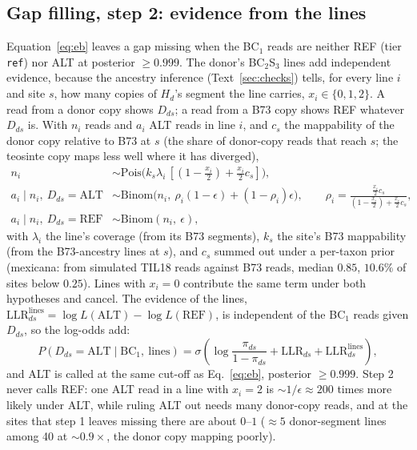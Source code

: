 \documentclass[11pt]{article}
\newcommand{\REF}{\mathrm{REF}}
\newcommand{\ALT}{\mathrm{ALT}}
\newcommand{\Bin}{\mathrm{Binom}}
\newcommand{\Pois}{\mathrm{Pois}}
\newcommand{\LLR}{\mathrm{LLR}}
\newcommand{\Hd}{H_d}
\newcommand{\code}[1]{\texttt{#1}}
\begin{document}
\subsection{Gap filling, step 2: evidence from the lines}
\label{sec:step2}
Equation~\eqref{eq:eb} leaves a gap missing when the BC$_1$ reads are neither REF (tier \code{ref}) nor ALT at posterior $\ge0.999$. The
donor's BC$_2$S$_3$ lines add independent evidence, because the ancestry inference (Text~\ref{sec:checks}) tells, for every line $i$ and
site $s$, how many copies of $\Hd$'s segment the line carries, $x_i\in\{0,1,2\}$. A read from a donor copy shows $D_{ds}$; a read from a
B73 copy shows REF whatever $D_{ds}$ is. With $n_i$ reads and $a_i$ ALT reads in line $i$, and $c_s$ the mappability of the donor copy
relative to B73 at $s$ (the share of donor-copy reads that reach $s$; the teosinte copy maps less well where it has diverged),
\begin{align}
n_i &\sim \Pois\!\big(k_s\lambda_i\,[(1-\tfrac{x_i}{2})+\tfrac{x_i}{2}c_s]\big),\\
a_i\mid n_i,\ D_{ds}=\ALT &\sim \Bin\!\big(n_i,\ \rho_i(1-\epsilon)+(1-\rho_i)\epsilon\big),\qquad
\rho_i=\frac{\tfrac{x_i}{2}c_s}{(1-\tfrac{x_i}{2})+\tfrac{x_i}{2}c_s},\\
a_i\mid n_i,\ D_{ds}=\REF &\sim \Bin(n_i,\ \epsilon),
\label{eq:lines}
\end{align}
with $\lambda_i$ the line's coverage (from its B73 segments), $k_s$ the site's B73 mappability (from the B73-ancestry lines at $s$), and
$c_s$ summed out under a per-taxon prior (mexicana: from simulated TIL18 reads against B73 reads, median $0.85$, $10.6\%$ of sites below
$0.25$). Lines with $x_i=0$ contribute the same term under both hypotheses and cancel. The evidence of the lines,
$\LLR^{\text{lines}}_{ds}=\log L(\ALT)-\log L(\REF)$, is independent of the BC$_1$ reads given $D_{ds}$, so the log-odds add:
\begin{equation}
P(D_{ds}=\ALT\mid\text{BC}_1,\ \text{lines})=\sigma\!\left(\log\frac{\pi_{ds}}{1-\pi_{ds}}+\LLR_{ds}+\LLR^{\text{lines}}_{ds}\right),
\label{eq:step2}
\end{equation}
and ALT is called at the same cut-off as Eq.~\eqref{eq:eb}, posterior $\ge0.999$. Step 2 never calls REF: one ALT read in a line with
$x_i=2$ is $\sim1/\epsilon\approx200$ times more likely under ALT, while ruling ALT out needs many donor-copy reads, and at the sites that
step 1 leaves missing there are about $0$--$1$ ($\approx5$ donor-segment lines among 40 at $\sim0.9\times$, the donor copy mapping poorly).
\end{document}
